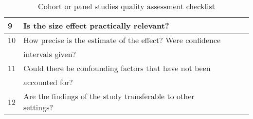 \begin{table}[H]
\begin{center}
{\begin{tabular}{|l||l|l|l|l|}
                        \hline  
                        9  & Is the size effect practically relevant?                         &&& \\
                        \hline  
                        10 & How precise is the estimate of the effect? Were confidence       &&& \\
                           & intervals given?                                                 &&& \\
                        \hline  
                        11 & Could there be confounding factors that have not been            &&& \\
                           & accounted for?                                                   &&& \\
                        \hline
                        12 & Are the findings of the study transferable to other settings?    &&& \\
                        \hline
                \end{tabular}}
        \end{center}
        \caption{Cohort or panel studies quality assessment checklist}
        \label{table:cohortStudy}
\end{table}


